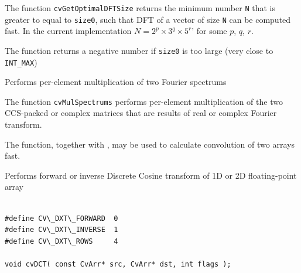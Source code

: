 \begin{description}
\end{description}


The function \texttt{cvGetOptimalDFTSize} returns the minimum number
\texttt{N} that is greater to equal to \texttt{size0}, such that DFT
of a vector of size \texttt{N} can be computed fast. In the current
implementation $N=2^p \times 3^q \times 5^r$' for some $p$, $q$, $r$.

The function returns a negative number if \texttt{size0} is too large
(very close to \texttt{INT\_MAX})


\label{MulSpectrums}

Performs per-element multiplication of two Fourier spectrums


\begin{description}

\end{description}

The function \texttt{cvMulSpectrums} performs per-element multiplication of the two CCS-packed or complex matrices that are results of real or complex Fourier transform.

The function, together with , may be used to calculate convolution of two arrays fast.


\label{DCT}

Performs forward or inverse Discrete Cosine transform of 1D or 2D floating-point array

\begin{lstlisting}

#define CV\_DXT\_FORWARD  0
#define CV\_DXT\_INVERSE  1
#define CV\_DXT\_ROWS     4

void cvDCT( const CvArr* src, CvArr* dst, int flags );

\end{lstlisting}

